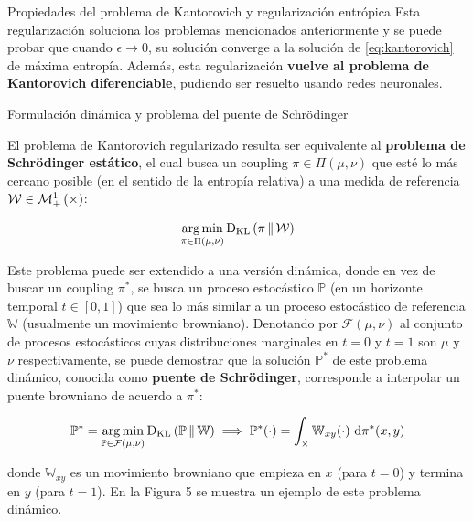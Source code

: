 \documentclass[final]{beamer}
\newlength{\colwidth}
\begin{document}
\begin{frame}[t]
\begin{columns}[t]
\begin{column}{\colwidth}
\begin{block}{Propiedades del problema de Kantorovich y regularización entrópica}
        Esta regularización soluciona los problemas mencionados anteriormente y se puede probar que cuando $\epsilon\to0$, su solución converge a la solución de \eqref{eq:kantorovich} de máxima entropía. Además, esta regularización \textbf{vuelve al problema de Kantorovich diferenciable}, pudiendo ser resuelto usando redes neuronales.

      \end{block}

      \begin{block}{Formulación dinámica y problema del puente de Schrödinger}

        El problema de Kantorovich regularizado resulta ser equivalente al \textbf{problema de Schrödinger estático}, el cual busca un coupling $\pi\in\Pi(\mu,\nu)$ que esté lo más cercano posible (en el sentido de la entropía relativa) a una medida de referencia $\mathcal{W}\in\probmeasure{\xspace\times\xspace}$:

        \begin{equation*}
          \operatorname*{arg\,min}_{\pi\in\Pi(\mu,\nu)} \operatorname{D_{KL}}\left(\pi\,\|\,\mathcal{W}\right)
        \end{equation*}

        Este problema puede ser extendido a una versión dinámica, donde en vez de buscar un coupling $\pi^*$, se busca un proceso estocástico $\mathbb{P}$ (en un horizonte temporal $t\in[0,1]$) que sea lo más similar a un proceso estocástico de referencia $\mathbb{W}$ (usualmente un movimiento browniano). Denotando por $\mathcal{F}(\mu,\nu)$ al conjunto de procesos estocásticos cuyas distribuciones marginales en $t=0$ y $t=1$ son $\mu$ y $\nu$ respectivamente, se puede demostrar que la solución $\mathbb{P}^*$ de este problema dinámico, conocida como \textbf{puente de Schrödinger}, corresponde a interpolar un puente browniano de acuerdo a $\pi^*$:

        \begin{equation*}
          \mathbb{P}^* = \operatorname*{arg\,min}_{\mathbb{P}\in\mathcal{F}(\mu,\nu)} \operatorname{D_{KL}}\left(\mathbb{P}\,\|\,\mathbb{W}\right) \implies \mathbb{P}^*(\cdot) = \int_{\times}\mathbb{W}_{xy}(\cdot) \,\operatorname{d}\!\pi^*(x,y)
        \end{equation*}

        donde $\mathbb{W}_{xy}$ es un movimiento browniano que empieza en $x$ (para $t=0$) y termina en $y$ (para $t=1$). En la Figura 5 se muestra un ejemplo de este problema dinámico.


\end{block}
\end{column}
\end{columns}
\end{frame}
\end{document}
